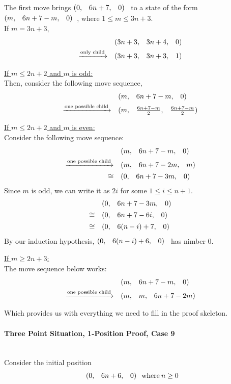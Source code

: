 \documentclass{article}
\makeatletter
\newcommand{\game}[3]{\begin{array}{@{}*6r}(#1, & #2, & #3)\end{array}}
\makeatother
\begin{document}
\medskip
The first move brings $\game{0}{6n+7}{0}$ to a state of the form
$\game{m}{6n+7-m}{0}$, where $1 \leq m \leq 3n+3$. \\
If $m = 3n + 3$,
\begin{align*}
  & \game{3n+3}{3n+4}{0} \\
  \xrightarrow{\text{only child}} \quad & 
  \game{3n+3}{3n+3}{1}
\end{align*}

\bigskip
\underline{If $m \leq 2n + 2$ and $m$ is odd:} \\
Then, consider the following move sequence,
\begin{align*}
  & \game{m}{6n+7-m}{0} \\
  \xrightarrow{\text{one possible child}} \quad & 
  \game{m}{\frac{6n+7-m}{2}}{\frac{6n+7-m}{2}}
\end{align*}

\bigskip
\underline{If $m \leq 2n + 2$ and $m$ is even:} \\
Consider the following move sequence:
\begin{align*}
  & \game{m}{6n+7-m}{0} \\
  \xrightarrow{\text{one possible child}} \quad & 
  \game{m}{6n+7-2m}{m} \\
  \cong \quad & 
  \game{0}{6n+7-3m}{0} \\
\end{align*}
Since $m$ is odd, we can write it as $2i$ for some $1\leq i\leq n+1$.
\begin{align*}
  & \game{0}{6n+7-3m}{0} \\
  \cong \quad & \game{0}{6n+7-6i}{0} \\
  \cong \quad & \game{0}{6(n-i)+7}{0} \\
\end{align*}
By our induction hypothesis, $\game{0}{6(n-i)+6}{0}$ has nimber $0$.

\bigskip
\underline{If $m \geq 2n + 3$:} \\
The move sequence below works:
\begin{align*}
  & \game{m}{6n+7-m}{0} \\
  \xrightarrow{\text{one possible child}} \quad & 
  \game{m}{m}{6n+7-2m}
\end{align*}

\bigskip
Which provides us with everything we need to fill in the proof
skeleton.

\paragraph{Three Point Situation, 1-Position Proof, Case 9}\mbox{}\\
Consider the initial position
\begin{equation*}
  \game{0}{6n+6}{0} \: \text{where} \: n \geq 0
\end{equation*}
\end{document}
